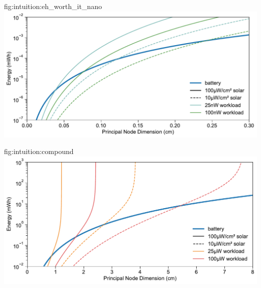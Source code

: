 \begin{definefigure}{fig:intuition:eh_worth_it_nano}
  \centering
  \includegraphics[width=\columnwidth]{figs/is_eh_worth_it_nano.pdf}
  \caption{
  A comparison of preallocated energy and captured energy for \ssi{\nano\watt} applications.
  This figure is identical to \cref{fig:intuition:eh_worth_it} except that it considers the \ssi{\nano\watt} workloads that characterize millimeter-scale systems.
  A principle node dimension on the order of 1-2\ssi{\milli\meter} is generally sufficient for energy harvesting to collect more energy over a battery, in all but the worst case: a heavier workload with low harvesting potential.
  }
\end{definefigure}


\begin{definefigure}{fig:intuition:compound}
  \centering
  \includegraphics[width=\columnwidth]{figs/is_eh_worth_it_micro_compound.pdf}
  \caption{
    The energy captured by a hybrid system utilizing both harvesting and backup preallocated energy. This figure uses the same scale and line types as \cref{fig:intuition:eh_worth_it}. The addition of energy harvesting to a primary cell system has a compounding effect on lifetime and harvested energy. More harvested energy results in a prolongation of the lifetime of the primary cell. Subsequently, this lifetime extension results in an increase in harvested energy.
    Because of the increased energy and battery lifetime, the crossing points now shift to the left in the figure, allowing a reduction in volume and area required for a battery and harvester, respectively.
  }
\end{definefigure}

